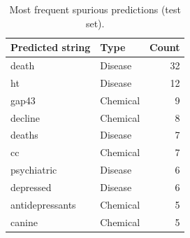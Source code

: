 \begin{table}[t]
\centering
\small
\caption{Most frequent spurious predictions (test set).}
\label{tab:topspur}
\begin{tabular}{llr}
\toprule
Predicted string & Type & Count \\
\midrule
death & Disease & 32 \\
ht & Disease & 12 \\
gap43 & Chemical & 9 \\
decline & Chemical & 8 \\
deaths & Disease & 7 \\
cc & Chemical & 7 \\
psychiatric & Disease & 6 \\
depressed & Disease & 6 \\
antidepressants & Chemical & 5 \\
canine & Chemical & 5 \\
\bottomrule
\end{tabular}
\end{table}
